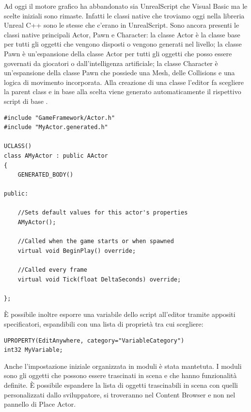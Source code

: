 Ad oggi il motore grafico ha abbandonato sia UnrealScript che Visual Basic ma le scelte iniziali sono rimaste.
%
Infatti le classi native che troviamo oggi nella libreria Unreal C++ sono le stesse che c'erano in UnrealScript.
%
Sono ancora presenti le classi native principali Actor, Pawn e Character: la classe Actor è la classe base per tutti gli oggetti che vengono disposti o vengono generati nel livello; la classe Pawn è un'espansione della classe Actor per tutti gli oggetti che posso essere governati da giocatori o dall'intelligenza artificiale; la classe Character è un'espansione della classe Pawn che possiede una Mesh, delle Collisions e una logica di movimento incorporata. 
%
Alla creazione di una classe l'editor fa scegliere la parent class e in base alla scelta viene generato automaticamente il rispettivo script di base \cite{UProgrIntro}.

\begin{lstlisting}[caption = File header generato alla creazione di un Actor]
#include "GameFramework/Actor.h"
#include "MyActor.generated.h"

UCLASS()
class AMyActor : public AActor
{
    GENERATED_BODY()

public:

    //Sets default values for this actor's properties
    AMyActor();

    //Called when the game starts or when spawned
    virtual void BeginPlay() override;

    //Called every frame
    virtual void Tick(float DeltaSeconds) override;

};
\end{lstlisting}

È possibile inoltre esporre una variabile dello script all'editor tramite appositi specificatori, espandibili con una lista di proprietà tra cui scegliere:

\begin{lstlisting}[caption = Specificatore UPROPERTY per esporre una variabile all'editor]
UPROPERTY(EditAnywhere, category="VariableCategory")
int32 MyVariable;
\end{lstlisting}

Anche l'impostazione iniziale organizzata in moduli è stata mantetuta.
%
I moduli sono gli oggetti che possono essere trascinati in scena e che hanno funzionalità definite.
%
È possibile espandere la lista di oggetti trascinabili in scena con quelli personalizzati dallo sviluppatore, si troveranno nel Content Browser e non nel pannello di Place Actor.

